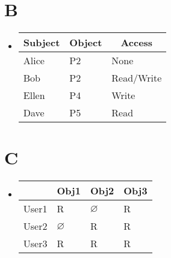 \documentclass[10pt]{article}
\begin{document}
	\section*{B}
	\begin{itemize}
		\item []
		\begin{tabular}{ | l | l | l |}
			\hline
			\multicolumn{1}{|c|}{\textbf{Subject}} & \multicolumn{1}{|c|}{\textbf{Object}} & \multicolumn{1}{c|}{\textbf{Access}} \\ \hline
			Alice & P2 & None \\ \hline
			Bob & P2 & Read/Write \\ \hline
			Ellen & P4 & Write \\ \hline
			Dave & P5 & Read \\ 
			\hline
		\end{tabular}
	\end{itemize}
	\section*{C}
	\begin{itemize}
		\item[]
		\begin{tabular}{| l || l | l | l |}
			\hline
			& \multicolumn{1}{c|}{\textbf{Obj1}} & \multicolumn{1}{c|}{\textbf{Obj2}} & \multicolumn{1}{c|}{\textbf{Obj3}} \\ \hline\hline
			User1 & R & \(\varnothing\) & R \\ \hline
			User2 & \(\varnothing\) & R & R \\ \hline
			User3 & R & R & R \\
			\hline
		\end{tabular}
	\end{itemize}
\end{document}
